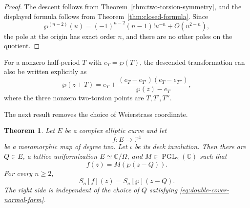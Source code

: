 \documentclass[11pt]{amsart}
\newtheorem{thm}{Theorem}[section]
\theoremstyle{definition}
\theoremstyle{remark}
\numberwithin{equation}{section}
\begin{document}
\begin{proof}
The descent follows from Theorem~\ref{thm:two-torsion-symmetry}, and the displayed formula follows from Theorem~\ref{thm:closed-formula}. Since
\[
\wp^{(n-2)}(u)=(-1)^{n-2}(n-1)!u^{-n}+O(u^{2-n}),
\]
the pole at the origin has exact order $n$, and there are no other poles on the quotient.
\end{proof}

For a nonzero half-period $T$ with $e_T=\wp(T)$, the descended transformation can also be written explicitly as
\[
\wp(z+T)
=e_T+
\frac{(e_T-e_{T'})(e_T-e_{T''})}{\wp(z)-e_T},
\]
where the three nonzero two-torsion points are $T,T',T''$.

The next result removes the choice of Weierstrass coordinate.

\begin{thm}\label{thm:double-cover}
Let $E$ be a complex elliptic curve and let
\[
f:E\longrightarrow\mathbb P^1
\]
be a meromorphic map of degree two. Let $\iota$ be its deck involution. Then there are $Q\in E$, a lattice uniformization $E\simeq\mathbb C/\Omega$, and $M\in\operatorname{PGL}_2(\mathbb C)$ such that
\begin{equation}\label{eq:double-cover-normal-form}
f(z)=M(\wp(z-Q)).
\end{equation}
For every $n\geq2$,
\begin{equation}\label{eq:double-cover-Sn}
S_n[f](z)=S_n[\wp](z-Q).
\end{equation}
The right side is independent of the choice of $Q$ satisfying \eqref{eq:double-cover-normal-form}.
\end{thm}
\end{document}
